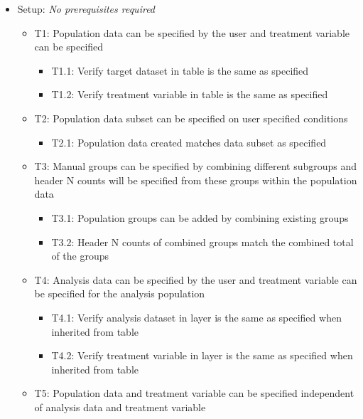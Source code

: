 \documentclass[
]{article}
\providecommand{\tightlist}{%
  \setlength{\itemsep}{0pt}\setlength{\parskip}{0pt}}
\begin{document}
\begin{itemize}
\item
  Setup: \emph{No prerequisites required}

  \begin{itemize}
  \tightlist
  \item
    T1: Population data can be specified by the user and treatment
    variable can be specified

    \begin{itemize}
    \tightlist
    \item
      T1.1: Verify target dataset in table is the same as specified
    \item
      T1.2: Verify treatment variable in table is the same as specified
    \end{itemize}
  \item
    T2: Population data subset can be specified on user specified
    conditions

    \begin{itemize}
    \tightlist
    \item
      T2.1: Population data created matches data subset as specified
    \end{itemize}
  \item
    T3: Manual groups can be specified by combining different subgroups
    and header N counts will be specified from these groups within the
    population data

    \begin{itemize}
    \tightlist
    \item
      T3.1: Population groups can be added by combining existing groups
    \item
      T3.2: Header N counts of combined groups match the combined total
      of the groups
    \end{itemize}
  \item
    T4: Analysis data can be specified by the user and treatment
    variable can be specified for the analysis population

    \begin{itemize}
    \tightlist
    \item
      T4.1: Verify analysis dataset in layer is the same as specified
      when inherited from table
    \item
      T4.2: Verify treatment variable in layer is the same as specified
      when inherited from table
    \end{itemize}
  \item
    T5: Population data and treatment variable can be specified
    independent of analysis data and treatment variable


\end{itemize}
\end{itemize}
\end{document}
